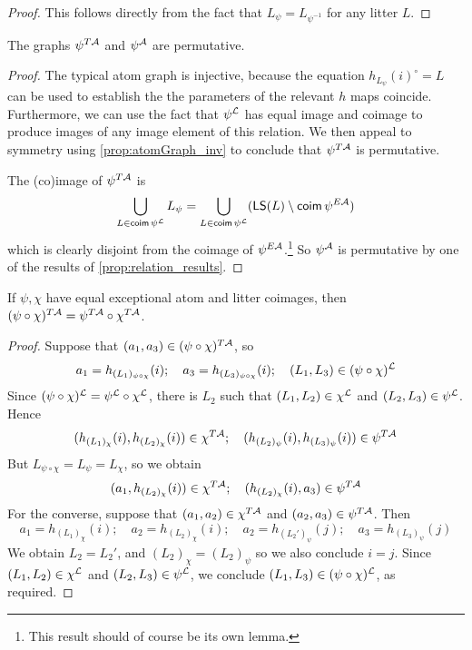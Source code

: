 \begin{proof}
  \leanok
  This follows directly from the fact that \( L_\psi = L_{\psi^{-1}} \) for any litter \( L \).
\end{proof}
\begin{proposition}
  \label{prop:atomGraph_permutative}
  \leanok
  The graphs \( \psi^{T{\mathcal A}} \) and \( \psi^{\mathcal A} \) are permutative.
\end{proposition}
\begin{proof}
  \leanok
  The typical atom graph is injective, because the equation \( h_{L_\psi}(i)^\circ = L \) can be used to establish the the parameters of the relevant \( h \) maps coincide.
  Furthermore, we can use the fact that \( \psi^{\mathcal L} \) has equal image and coimage to produce images of any image element of this relation.
  We then appeal to symmetry using \cref{prop:atomGraph_inv} to conclude that \( \psi^{T{\mathcal A}} \) is permutative.

  The (co)image of \( \psi^{T{\mathcal A}} \) is
  \[ \bigcup_{L \in \operatorname{\mathsf{coim}} \psi^{\mathcal L}} L_\psi = \bigcup_{L \in \operatorname{\mathsf{coim}} \psi^{\mathcal L}} (\operatorname{\mathsf{LS}}(L) \setminus \operatorname{\mathsf{coim}} \psi^{E{\mathcal A}}) \]
  which is clearly disjoint from the coimage of \( \psi^{E{\mathcal A}} \).\footnote{This result should of course be its own lemma.}
  So \( \psi^{\mathcal A} \) is permutative by one of the results of \cref{prop:relation_results}.
\end{proof}
\begin{proposition}
  \label{prop:comp_atomGraph}
  If \( \psi, \chi \) have equal exceptional atom and litter coimages, then \( (\psi \circ \chi)^{T{\mathcal A}} = \psi^{T{\mathcal A}} \circ \chi^{T{\mathcal A}} \).
\end{proposition}
\begin{proof}
  Suppose that \( (a_1, a_3) \in (\psi \circ \chi)^{T{\mathcal A}} \), so
  \[ a_1 = h_{(L_1)_{\psi \circ \chi}}(i);\quad a_3 = h_{(L_3)_{\psi \circ \chi}}(i);\quad (L_1, L_3) \in (\psi \circ \chi)^{\mathcal L} \]
  Since \( (\psi \circ \chi)^{\mathcal L} = \psi^{\mathcal L} \circ \chi^{\mathcal L} \), there is \( L_2 \) such that \( (L_1, L_2) \in \chi^{\mathcal L} \) and \( (L_2, L_3) \in \psi^{\mathcal L} \).
  Hence
  \[ (h_{(L_1)_\chi}(i), h_{(L_2)_\chi}(i)) \in \chi^{T{\mathcal A}};\quad (h_{(L_2)_\psi}(i), h_{(L_3)_\psi}(i)) \in \psi^{T{\mathcal A}} \]
  But \( L_{\psi \circ \chi} = L_\psi = L_\chi \), so we obtain
  \[ (a_1, h_{(L_2)_\chi}(i)) \in \chi^{T{\mathcal A}};\quad (h_{(L_2)_\chi}(i), a_3) \in \psi^{T{\mathcal A}} \]
  For the converse, suppose that \( (a_1, a_2) \in \chi^{T{\mathcal A}} \) and \( (a_2, a_3) \in \psi^{T{\mathcal A}} \).
  Then
  \[ a_1 = h_{(L_1)_\chi}(i);\quad a_2 = h_{(L_2)_\chi}(i);\quad a_2 = h_{(L_2')_\psi}(j);\quad a_3 = h_{(L_3)_\psi}(j) \]
  We obtain \( L_2 = L_2' \), and \( (L_2)_\chi = (L_2)_\psi \) so we also conclude \( i = j \).
  Since \( (L_1, L_2) \in \chi^{\mathcal L} \) and \( (L_2, L_3) \in \psi^{\mathcal L} \), we conclude \( (L_1, L_3) \in (\psi \circ \chi)^{\mathcal L} \), as required.
\end{proof}
